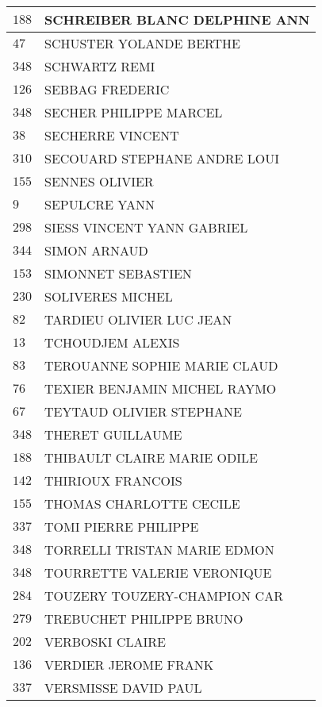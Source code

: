 \begin{xltabular}{\linewidth}{|l|X|}
    \hline
    $188$ & SCHREIBER BLANC DELPHINE ANN \\
    \hline
    $47$ & SCHUSTER YOLANDE BERTHE \\
    \hline
    $348$ & SCHWARTZ REMI \\
    \hline
    $126$ & SEBBAG FREDERIC \\
    \hline
    $348$ & SECHER PHILIPPE MARCEL \\
    \hline
    $38$ & SECHERRE VINCENT \\
    \hline
    $310$ & SECOUARD STEPHANE ANDRE LOUI \\
    \hline
    $155$ & SENNES OLIVIER \\
    \hline
    $9$ & SEPULCRE YANN \\
    \hline
    $298$ & SIESS VINCENT YANN GABRIEL \\
    \hline
    $344$ & SIMON ARNAUD \\
    \hline
    $153$ & SIMONNET SEBASTIEN \\
    \hline
    $230$ & SOLIVERES MICHEL \\
    \hline
    $82$ & TARDIEU OLIVIER LUC JEAN \\
    \hline
    $13$ & TCHOUDJEM ALEXIS \\
    \hline
    $83$ & TEROUANNE SOPHIE MARIE CLAUD \\
    \hline
    $76$ & TEXIER BENJAMIN MICHEL RAYMO \\
    \hline
    $67$ & TEYTAUD OLIVIER STEPHANE \\
    \hline
    $348$ & THERET GUILLAUME \\
    \hline
    $188$ & THIBAULT CLAIRE MARIE ODILE \\
    \hline
    $142$ & THIRIOUX FRANCOIS \\
    \hline
    $155$ & THOMAS CHARLOTTE CECILE \\
    \hline
    $337$ & TOMI PIERRE PHILIPPE \\
    \hline
    $348$ & TORRELLI TRISTAN MARIE EDMON \\
    \hline
    $348$ & TOURRETTE VALERIE VERONIQUE \\
    \hline
    $284$ & TOUZERY TOUZERY-CHAMPION CAR \\
    \hline
    $279$ & TREBUCHET PHILIPPE BRUNO \\
    \hline
    $202$ & VERBOSKI CLAIRE \\
    \hline
    $136$ & VERDIER JEROME FRANK \\
    \hline
    $337$ & VERSMISSE DAVID PAUL \\

\end{xltabular}
